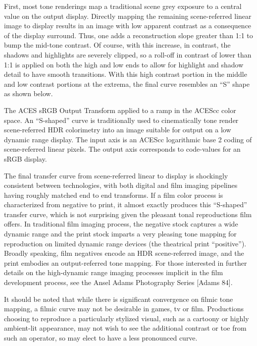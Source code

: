 First, most tone renderings map a traditional scene grey exposure to a central value on the output display. Directly mapping the remaining scene-referred linear image to display results in an image with low apparent contrast as a consequence of the display surround. Thus, one adds a reconstruction slope greater than 1:1 to bump the mid-tone contrast.  Of course, with this increase, in contrast, the shadows and highlights are severely clipped, so a roll-off in contrast of lower than 1:1 is applied on both the high and low ends to allow for highlight and shadow detail to have smooth transitions. With this high contrast portion in the middle and low contrast portions at the extrema, the final curve resembles an “S” shape as shown below.

The ACES sRGB Output Transform applied to a ramp in the ACEScc color space.
An “S-shaped” curve is traditionally used to cinematically tone render scene-referred HDR colorimetry into an image suitable for output on a low dynamic range display. The input axis is an ACEScc logarithmic base 2 coding of scene-referred linear pixels. The output axis corresponds to code-values for an sRGB display.

The final transfer curve from scene-referred linear to display is shockingly consistent between technologies, with both digital and film imaging pipelines having roughly matched end to end transforms. If a film color process is characterized from negative to print, it almost exactly produces this “S-shaped” transfer curve, which is not surprising given the pleasant tonal reproductions film offers. In traditional film imaging process, the negative stock captures a wide dynamic range and the print stock imparts a very pleasing tone mapping for reproduction on limited dynamic range devices (the theatrical print “positive”). Broadly speaking, film negatives encode an HDR scene-referred image, and the print embodies an output-referred tone mapping. For those interested in further details on the high-dynamic range imaging processes implicit in the film development process, see the Ansel Adams Photography Series [Adams 84].

It should be noted that while there is significant convergence on filmic tone mapping, a filmic curve may not be desirable in games, tv or film. Productions choosing to reproduce a particularly stylized visual, such as a cartoony or highly ambient-lit appearance, may not wish to see the additional contrast or toe from such an operator, so may elect to have a less pronounced curve.

